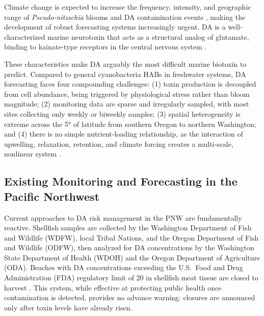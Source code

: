 \documentclass[preprint,12pt,authoryear]{elsarticle}
\begin{document}
Climate change is expected to increase the frequency, intensity, and geographic range of \textit{Pseudo-nitzschia} blooms and DA contamination events \citep{Wells2015, Litchman2023}, making the development of robust forecasting systems increasingly urgent. DA is a well-characterized marine neurotoxin that acts as a structural analog of glutamate, binding to kainate-type receptors in the central nervous system \citep{Mos2001}.

These characteristics make DA arguably the most difficult marine biotoxin to predict. Compared to general cyanobacteria HABs in freshwater systems, DA forecasting faces four compounding challenges: (1) toxin production is decoupled from cell abundance, being triggered by physiological stress rather than bloom magnitude; (2) monitoring data are sparse and irregularly sampled, with most sites collecting only weekly or biweekly samples; (3) spatial heterogeneity is extreme across the \ang{5} of latitude from southern Oregon to northern Washington; and (4) there is no simple nutrient-loading relationship, as the interaction of upwelling, relaxation, retention, and climate forcing creates a multi-scale, nonlinear system \citep{Bates2018, Trainer2012, McKibben2017}.

\subsection{Existing Monitoring and Forecasting in the Pacific Northwest}
\label{sec:intro-monitoring}

Current approaches to DA risk management in the PNW are fundamentally reactive. Shellfish samples are collected by the Washington Department of Fish and Wildlife (WDFW), local Tribal Nations, and the Oregon Department of Fish and Wildlife (ODFW), then analyzed for DA concentrations by the Washington State Department of Health (WDOH) and the Oregon Department of Agriculture (ODA). Beaches with DA concentrations exceeding the U.S.\ Food and Drug Administration (FDA) regulatory limit of \SI{20}{\microgrampeg} in shellfish meat tissue are closed to harvest \citep{McCabe2023}. This system, while effective at protecting public health once contamination is detected, provides no advance warning: closures are announced only after toxin levels have already risen.
\end{document}

